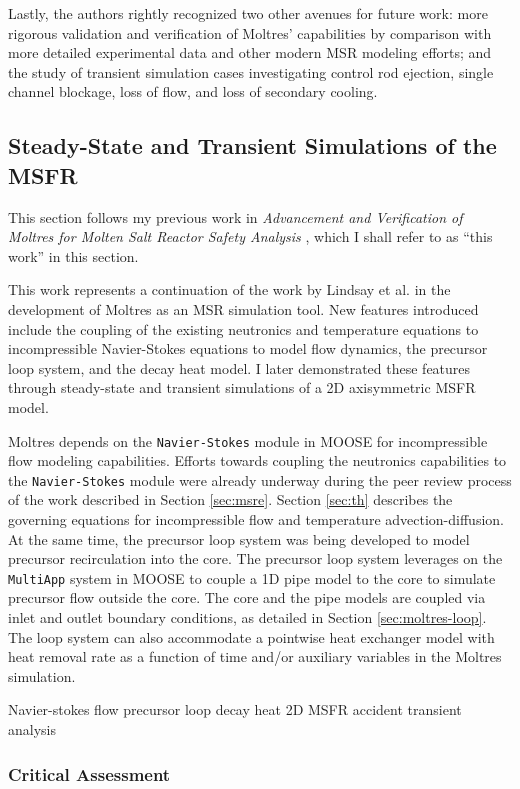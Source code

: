 Lastly, the authors rightly recognized two other avenues for future work: more
rigorous validation and verification of Moltres' capabilities by comparison
with more detailed experimental data and other modern \gls{MSR} modeling
efforts; and the study of transient simulation cases investigating control rod
ejection, single channel blockage, loss of flow, and loss of secondary cooling.

\subsection{Steady-State and Transient Simulations of the MSFR}
\label{sec:msfr}

This section follows my previous work in \textit{Advancement and Verification
of Moltres for Molten Salt Reactor Safety Analysis}
\cite{park_advancement_2020}, which I shall refer to as ``this work'' in this
section.

This work represents a continuation of the work by Lindsay et al.
\cite{lindsay_introduction_2018} in the development of Moltres as an \gls{MSR}
simulation tool. New features introduced include the coupling of the existing
neutronics and temperature equations to incompressible Navier-Stokes equations
to model flow dynamics, the precursor loop system, and the decay heat model.
I later demonstrated these features through steady-state and transient
simulations of a 2D axisymmetric \gls{MSFR} model.

Moltres depends on the \texttt{Navier-Stokes} module in \gls{MOOSE} for
incompressible flow modeling capabilities. Efforts towards coupling
the neutronics capabilities to the \texttt{Navier-Stokes} module were already
underway during the peer review process of the work described in Section
\ref{sec:msre}. Section \ref{sec:th} describes the governing equations for
incompressible flow and temperature advection-diffusion. At the same time,
the precursor loop system was being developed to model
precursor recirculation into the core. The precursor loop system leverages on
the \texttt{MultiApp} system in \gls{MOOSE} to couple a 1D pipe model to the
core to simulate precursor flow outside the core. The core and the pipe models
are coupled via inlet and outlet boundary conditions, as detailed in Section
\ref{sec:moltres-loop}. The loop system can also accommodate a pointwise heat
exchanger model with heat removal rate as a function of time
and/or auxiliary variables in the Moltres simulation.



Navier-stokes flow
precursor loop
decay heat
2D MSFR
accident transient analysis

\subsubsection{Critical Assessment} \label{msfr-critique}


